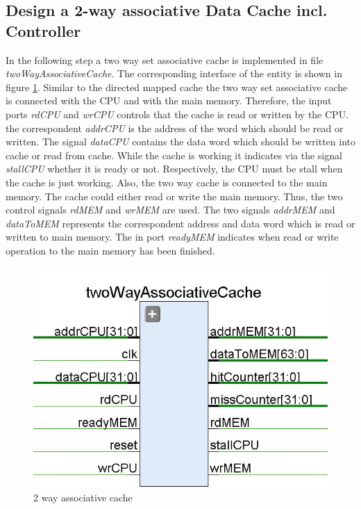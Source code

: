 \subsection{Design a 2-way associative Data Cache incl. Controller}
In the following step a two way set associative cache is implemented in file \textit{twoWayAssociativeCache}. The corresponding interface of the entity is shown in figure \ref{fig:twoWayCacheInterface}. Similar to the directed mapped cache the two way set associative cache is connected with the CPU and with the main memory. Therefore, the input ports \textit{rdCPU} and \textit{wrCPU} controls that the cache is read or written by the CPU. the correspondent \textit{addrCPU} is the address of the word which should be read or written. The signal \textit{dataCPU} contains the data word which should be written into cache or read from cache. While the cache is working it indicates via the signal \textit{stallCPU} whether it is ready or not. Respectively, the CPU must be stall when the cache is just working. Also, the two way cache is connected to the main memory. The cache could either read or write the main memory. Thus, the two control signals \textit{rdMEM} and \textit{wrMEM} are used. The two signals \textit{addrMEM} and \textit{dataToMEM} represents the correspondent address and data word which is read or written to main memory. The in port \textit{readyMEM} indicates when read or write operation to the main memory has been finished.
\begin{figure}
	\centering
	\includegraphics[scale=.8]{pictures/twoWaySetAssociativeCache.JPG}
	\caption{2 way associative cache}
	\label{fig:twoWayCacheInterface}
\end{figure}
